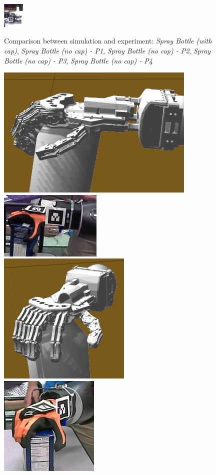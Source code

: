 \begin{figure}[!!hbt]
\begin{center}
{\includegraphics[width=0.09\textwidth]{images/ssoch/fig/spray_p4}\label{spray_p4}}
        \caption{Comparison between simulation and experiment: \emph{Spray Bottle (with cap)}, \emph{Spray Bottle (no cap) - P1}, \emph{Spray Bottle (no cap) - P2}, \emph{Spray Bottle (no cap) - P3}, \emph{Spray Bottle (no cap) - P4}}
        \label{spray}
        \end{center}
\end{figure}


\begin{figure}[!!hbt]
\begin{center}
{\includegraphics[height=0.24\columnwidth]     {images/ssoch/fig/kh_changes/softhand_p1_simu01}}%
{\includegraphics[height=0.24\columnwidth]     {images/ssoch/fig/kh_changes/softhand_p1_grasp}}
{\includegraphics[height=0.24\columnwidth]     {images/ssoch/fig/kh_changes/softhand_p2_simu01}}%
{\includegraphics[height=0.24\columnwidth]     {images/ssoch/fig/kh_changes/softhand_p2_grasp}}

\end{center}
\end{figure}
